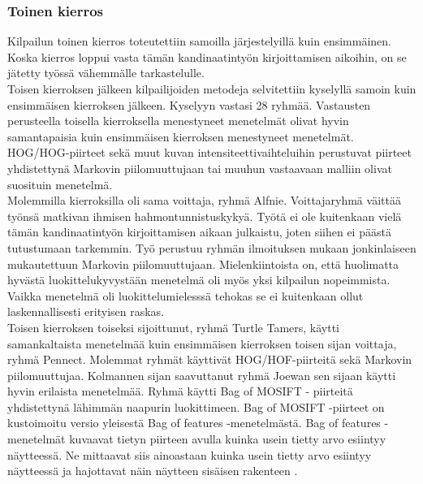 \subsubsection {Toinen kierros}

Kilpailun toinen kierros toteutettiin samoilla järjestelyillä kuin ensimmäinen. Koska kierros loppui
vasta tämän kandinaatintyön kirjoittamisen aikoihin, on se jätetty työssä vähemmälle tarkastelulle.\\

Toisen kierroksen jälkeen kilpailijoiden metodeja selvitettiin kyselyllä samoin kuin ensimmäisen
kierroksen jälkeen. Kyselyyn vastasi 28 ryhmää. Vastausten perusteella toisella kierroksella menestyneet 
menetelmät olivat hyvin samantapaisia kuin ensimmäisen kierroksen menestyneet menetelmät. HOG/HOG-piirteet sekä muut
kuvan intensiteettivaihteluihin perustuvat piirteet yhdistettynä Markovin piilomuuttujaan tai muuhun
vastaavaan malliin olivat suosituin menetelmä. \citep{chalearn2}\\

Molemmilla kierroksilla oli sama voittaja, ryhmä Alfnie. 
Voittajaryhmä väittää työnsä matkivan ihmisen hahmontunnistuskykyä. Työtä ei ole kuitenkaan vielä tämän kandinaatintyön kirjoittamisen aikaan julkaistu,
 joten siihen ei päästä tutustumaan tarkemmin. Työ perustuu
ryhmän ilmoituksen mukaan jonkinlaiseen mukautettuun Markovin piilomuuttujaan. Mielenkiintoista on,
että huolimatta hyvästä luokittelukyvystään menetelmä oli myös yksi kilpailun nopeimmista. Vaikka menetelmä oli 
luokittelumielesssä tehokas se ei kuitenkaan ollut laskennallisesti erityisen raskas. \citep{chalearn2}\\

Toisen kierroksen toiseksi sijoittunut, ryhmä Turtle Tamers, käytti samankaltaista menetelmää kuin 
ensimmäisen kierroksen toisen sijan voittaja, ryhmä Pennect. Molemmat ryhmät käyttivät HOG/HOF-piirteitä sekä Markovin piilomuuttujaa. 
Kolmannen sijan saavuttanut ryhmä Joewan sen sijaan käytti hyvin erilaista menetelmää. Ryhmä käytti Bag of MOSIFT -
piirteitä yhdistettynä lähimmän naapurin luokittimeen. \citep{chalearn2} Bag of MOSIFT -piirteet on kustoimoitu versio
yleisestä Bag of features -menetelmästä. Bag of features -menetelmät kuvaavat tietyn piirteen avulla
kuinka usein tietty arvo esiintyy näytteessä. Ne mittaavat siis ainoastaan kuinka usein tietty arvo esiintyy näytteessä ja
hajottavat näin näytteen sisäisen rakenteen \citep{bagoffeatures}. \\

